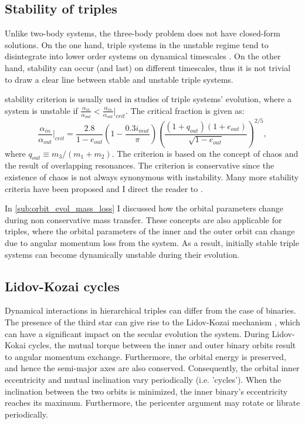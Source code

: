 \subsection{Stability of triples}\label{sub:stability_triples}

Unlike two-body systems, the three-body problem does not have closed-form solutions. On the one hand, triple systems in the unstable regime tend to disintegrate into lower order systems on dynamical timescales \citep{van2007formation}. On the other hand, stability can occur (and last) on different timescales, thus it is not trivial to draw a clear line between stable and unstable triple systems. 

\cite{mardling1999dynamics} stability criterion is usually used in studies of triple systems' evolution, where a system is unstable if
$\frac{\alpha_{in}}{\alpha_{out}} < \frac{\alpha_{in}}{\alpha_{out}} |_{crit}$. The critical fraction is given as:
\begin{equation}\label{eq:stability_regime}
    \frac{\alpha_{in}}{\alpha_{out}} |_{crit} = \frac{2.8}{1-e_{out}} (1- \frac{0.3 i_{mut}}{\pi}) \left ( \frac{(1 + q_{out})(1+e_{out})}{\sqrt{1-e_{out}}} \right )^{2/5},
\end{equation}
where $q_{out} \equiv m_3 / (m_1 + m_2)$. The criterion is based on the concept of chaos and the result of overlapping resonances. The criterion is conservative since the existence of chaos is not always synonymous with instability. Many more stability criteria have been proposed and I direct the reader to \cite{mardling2001stability,georgakarakos2008stability}.

In \cref{sub:orbit_evol_mass_loss} I discussed how the orbital parameters change during non conservative mass transfer. These concepts are also applicable for triples, where the orbital parameters of the inner and the outer orbit can change due to angular momentum loss from the system. As a result, initially stable triple systems can become dynamically unstable during their evolution.

\subsection{Lidov-Kozai cycles}\label{sub:lidov_kozai}

Dynamical interactions in hierarchical triples can differ from the case of binaries. The presence of the third star can give rise to the Lidov-Kozai mechanism \citep{lidov1962evolution,kozai1962secular}, which can have a significant impact on the secular evolution the system. During Lidov-Kokai cycles, the mutual torque between the inner and outer binary orbits result to angular momentum exchange. Furthermore, the orbital energy is preserved, and hence the semi-major axes are also conserved. Consequently, the orbital inner eccentricity and mutual inclination vary periodically (i.e. 'cycles'). When the inclination between the two orbits is minimized, the inner binary's eccentricity reaches its maximum. Furthermore, the pericenter argument may rotate or librate periodically.

